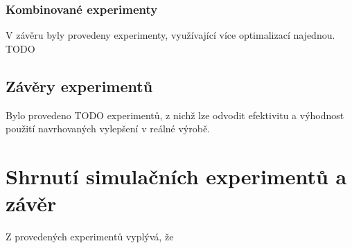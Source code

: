 \documentclass[11pt, a4paper]{article}
\begin{document}
\subsubsection{Kombinované experimenty}
V závěru byly provedeny experimenty, využívající více optimalizací najednou. TODO

\subsection{Závěry experimentů}
Bylo provedeno TODO experimentů, z nichž lze odvodit efektivitu a výhodnost použití navrhovaných vylepšení v reálné výrobě.

\section{Shrnutí simulačních experimentů a závěr}
Z provedených experimentů vyplývá, že
\end{document}
